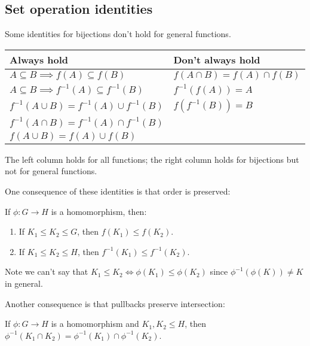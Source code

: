 \documentclass[12pt,letterpaper]{report}
\begin{document}
\pagebreak
\subsection{Set operation identities}

Some identities for bijections don't hold for general functions.

\begin{center}
  \renewcommand{\arraystretch}{1.5}
  \begin{tabular}{ll}
    Always hold                                            & Don't always hold \\
    \hline
    $A \subseteq B \implies f(A) \subseteq f(B)$           & $f(A \cap B) = f(A) \cap f(B)$ \\
    $A \subseteq B \implies f^{-1}(A) \subseteq f^{-1}(B) \qquad$ & $f^{-1}(f(A)) = A$ \\
    $f^{-1}(A \cup B) = f^{-1}(A) \cup f^{-1}(B)$          & $f(f^{-1}(B)) = B$ \\
    $f^{-1}(A \cap B) = f^{-1}(A) \cap f^{-1}(B)$          & \\
    $f(A \cup B) = f(A) \cup f(B)$                         & \\
  \end{tabular}
\end{center}

The left column holds for all functions; the right column holds for bijections but not for general
functions.

One consequence of these identities is that order is preserved:

\begin{lem}{}{}
  If $\phi \colon G \to H$ is a homomorphism, then:
  \begin{enumerate}
    \item If $K_1 \leq K_2 \leq G$, then $f(K_1) \leq f(K_2)$.
    \item If $K_1 \leq K_2 \leq H$, then $f^{-1}(K_1) \leq f^{-1}(K_2)$.
  \end{enumerate}
\end{lem}

Note we can't say that $K_1 \leq K_2 \iff \phi(K_1) \leq \phi(K_2)$ since
$\phi^{-1}(\phi(K)) \neq K$ in general.

Another consequence is that pullbacks preserve intersection:

\begin{lem}{}{}
  If $\phi \colon G \to H$ is a homomorphism and $K_1, K_2 \leq H$, then
  $\phi^{-1}(K_1 \cap K_2) = \phi^{-1}(K_1) \cap \phi^{-1}(K_2)$.
\end{lem}
\end{document}
